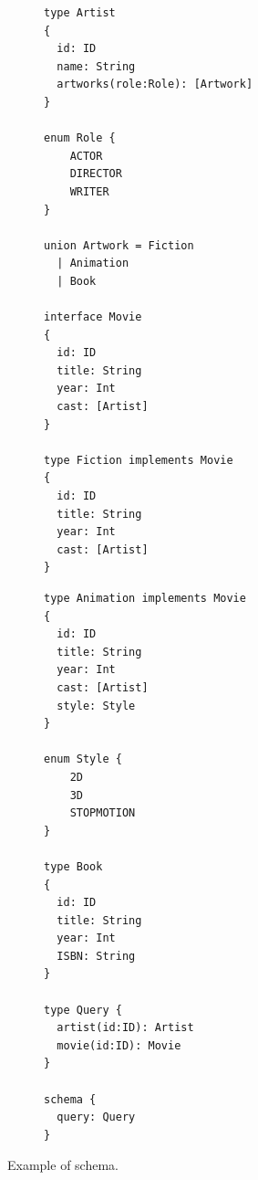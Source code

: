 \begin{figure}
    \centering
    \begin{subfigure}{.5\linewidth}
    
    \begin{verbatim}
type Artist
{
  id: ID
  name: String
  artworks(role:Role): [Artwork]
}

enum Role { 
	ACTOR
	DIRECTOR
	WRITER
}

union Artwork = Fiction
  | Animation 
  | Book

interface Movie
{
  id: ID		
  title: String
  year: Int
  cast: [Artist]
}

type Fiction implements Movie
{
  id: ID		
  title: String
  year: Int
  cast: [Artist]
}
    \end{verbatim}
    \end{subfigure}%
    \begin{subfigure}{.5\linewidth}
    \begin{verbatim}
type Animation implements Movie
{
  id: ID		
  title: String
  year: Int
  cast: [Artist]
  style: Style
}

enum Style {
	2D
	3D
	STOPMOTION
}

type Book
{
  id: ID
  title: String
  year: Int
  ISBN: String
}

type Query {
  artist(id:ID): Artist
  movie(id:ID): Movie
}

schema {
  query: Query
}
    \end{verbatim}
    \end{subfigure}
    
    \caption{Example of \gql schema.}
    \label{fig:schema_ex}
\end{figure}


